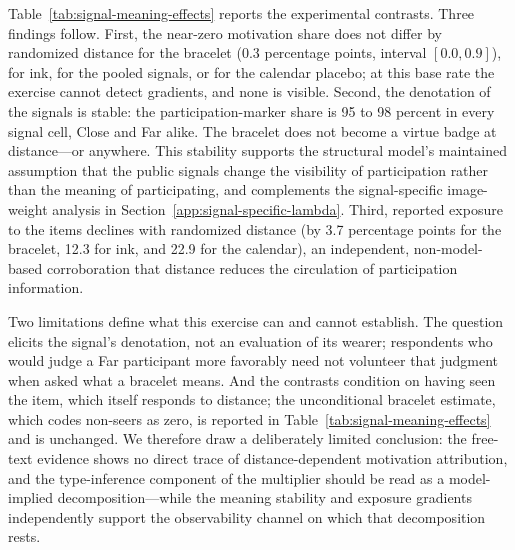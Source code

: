 \documentclass[12pt]{article}
\begin{document}
Table~\ref{tab:signal-meaning-effects} reports the experimental contrasts.
Three findings follow. First, the near-zero motivation share does not differ
by randomized distance for the bracelet (0.3 percentage points, interval
$[0.0, 0.9]$), for ink, for the pooled signals, or for the calendar placebo;
at this base rate the exercise cannot detect gradients, and none is visible.
Second, the denotation of the signals is stable: the participation-marker
share is 95 to 98 percent in every signal cell, Close and Far alike. The
bracelet does not become a virtue badge at distance---or anywhere. This
stability supports the structural model's maintained assumption that the
public signals change the visibility of participation rather than the meaning
of participating, and complements the signal-specific image-weight analysis in
Section~\ref{app:signal-specific-lambda}. Third, reported exposure to the
items declines with randomized distance (by 3.7 percentage points for the
bracelet, 12.3 for ink, and 22.9 for the calendar), an independent,
non-model-based corroboration that distance reduces the circulation of
participation information.

Two limitations define what this exercise can and cannot establish. The
question elicits the signal's denotation, not an evaluation of its wearer;
respondents who would judge a Far participant more favorably need not
volunteer that judgment when asked what a bracelet means. And the contrasts
condition on having seen the item, which itself responds to distance; the
unconditional bracelet estimate, which codes non-seers as zero, is reported in
Table~\ref{tab:signal-meaning-effects} and is unchanged. We therefore draw a
deliberately limited conclusion: the free-text evidence shows no direct trace
of distance-dependent motivation attribution, and the type-inference component
of the multiplier should be read as a model-implied decomposition---while the
meaning stability and exposure gradients independently support the
observability channel on which that decomposition rests.
\end{document}
